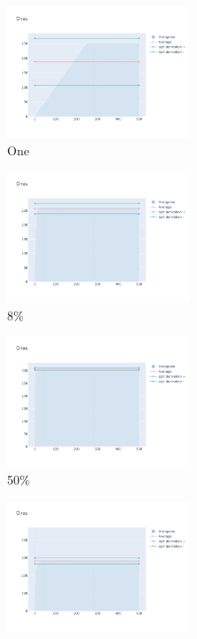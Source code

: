 \documentclass[12pt, fleqn]{report}                             %
\theoremstyle{break}                                            %
\begin{document}
      \begin{figure}[ht!]
        \centering
        \begin{subfigure}[b]{0.4\linewidth}
          \includegraphics[width=0.6\textwidth]{Images/58/dia-a.png}
          \caption{One}
        \end{subfigure}
        \begin{subfigure}[b]{0.4\linewidth}
          \includegraphics[width=0.6\textwidth]{Images/58/dia-b.png}
          \caption{8\%}
        \end{subfigure}
        \begin{subfigure}[b]{0.4\linewidth}
          \includegraphics[width=0.6\textwidth]{Images/58/dia-c.png}
          \caption{50\%}
        \end{subfigure}
        \begin{subfigure}[b]{0.4\linewidth}
          \includegraphics[width=0.6\textwidth]{Images/58/dia-d.png}

\end{subfigure}
\end{figure}
\end{document}
